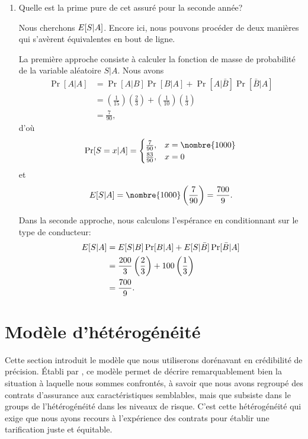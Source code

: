 \begin{enumerate}
\item Quelle est la prime pure de cet assuré pour la seconde année?

  Nous cherchons $E [ S|A ]$. Encore ici, nous pouvons procéder de
  deux manières qui s'avèrent équivalentes en bout de ligne.

  La première approche consiste à calculer la fonction de masse de
  probabilité de la variable aléatoire $S|A$. Nous avons
  \begin{align*}
    \Pr[A|A]
    &= \Pr[A|B] \Pr[B|A] + \Pr[A|\bar{B}] \Pr[\bar{B}|A] \\
    &= \left( \frac{1}{15} \right) \left( \frac{2}{3} \right)
      + \left( \frac{1}{10} \right) \left( \frac{1}{3} \right) \\
    &= \frac{7}{90},
  \end{align*}
  d'où
  \begin{equation*}
    \Pr[S = x|A] =
    \begin{cases}
      \frac{7}{90}, & x = \nombre{1000} \\
      \frac{83}{90}, & x = 0
    \end{cases}
  \end{equation*}
  et
  \begin{equation*}
    \esp{S|A} = \nombre{1000} \left( \frac{7}{90} \right)
    = \frac{700}{9}.
  \end{equation*}

  Dans la seconde approche, nous calculons l'espérance en
  conditionnant sur le type de conducteur:
  \begin{align*}
    E [ S|A ]
    &= E [ S|B ] \Pr[B|A] + E [ S|\bar{B} ] \Pr[\bar{B}|A] \\
    &= \frac{200}{3} \left( \frac{2}{3} \right)
      + 100 \left( \frac{1}{3} \right) \\
    &= \frac{700}{9}.
  \end{align*}
\end{enumerate}



\section{Modèle d'hétérogénéité}
\label{sec:bayesienne:modele}

Cette section introduit le modèle que nous utiliserons dorénavant en
crédibilité de précision. Établi par
\cite{Buhlmann:credibility:1967,Buhlmann:credibility:1969}, ce modèle
permet de décrire remarquablement bien la situation à laquelle nous
sommes confrontés, à savoir que nous avons regroupé des contrats
d'assurance aux caractéristiques semblables, mais que subsiste dans le
groups de l'hétérogénéité dans les niveaux de risque. C'est cette
hétérogénéité qui exige que nous ayons recours à l'expérience des
contrats pour établir une tarification juste et équitable.

